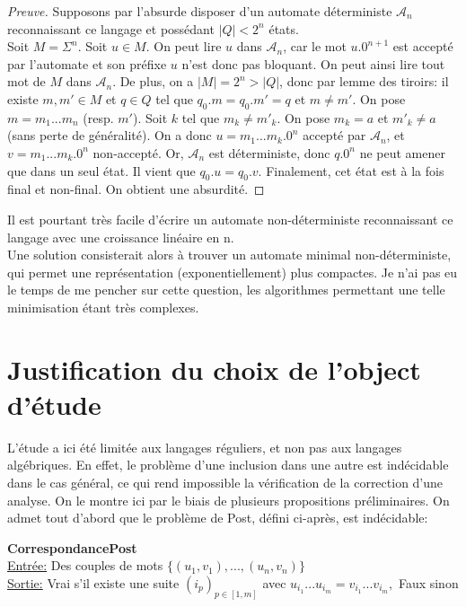 \documentclass{article}
\newenvironment{preuve}{\begin{proof}[Preuve]}{\end{proof}}
\begin{document}
\begin{preuve}
    Supposons par l'absurde disposer d'un automate déterministe $\mathcal{A}_n$
    reconnaissant ce langage et possédant $|Q| < 2^n$ états. \\
    Soit $M = \Sigma^n$. Soit $u \in M$. On peut lire $u$ dans $\mathcal{A}_n$, car le mot $u.0^{n+1}$
    est accepté par l'automate et son préfixe $u$ n'est donc pas bloquant. On peut ainsi lire tout mot de $M$ dans $\mathcal{A}_n$.
    De plus, on a $|M| = 2^n > |Q|$, donc par lemme des tiroirs: il existe $m, m' \in M$ et $q \in Q$ tel que $q_0.m = q_0.m' = q$
    et $m \neq m'$. On pose $m = m_1...m_n$ (resp. $m'$). Soit $k$ tel que $m_k \neq m'_k$. On pose $m_k = a$ et $m'_k \neq a$ (sans perte
    de généralité). On a donc $u = m_1...m_k.0^n$ accepté par $\mathcal{A}_n$, et $v = m_1...m_k.0^n$ non-accepté.
    Or, $\mathcal{A}_n$ est déterministe, donc $q.0^n$ ne peut amener que dans un seul état. Il vient que $q_0.u = q_0.v$.
    Finalement, cet état est à la fois final et non-final. On obtient une absurdité.
\end{preuve}

Il est pourtant très facile d'écrire un automate non-déterministe reconnaissant ce langage
avec une croissance linéaire en n.  \\ %
Une solution consisterait alors à trouver un automate minimal non-déterministe, qui permet une représentation
(exponentiellement) plus compactes. Je n'ai pas eu le temps de me pencher sur cette question,
les algorithmes permettant une telle minimisation étant très complexes.

\section{Justification du choix de l'object d'étude}

L'étude a ici été limitée aux langages réguliers, et non pas aux langages algébriques. En effet,
le problème d'une inclusion dans une autre est indécidable dans le cas général, ce qui rend impossible la vérification
de la correction d'une analyse. On le montre ici par le biais de plusieurs propositions préliminaires.
On admet tout d'abord que le problème de Post, défini ci-après, est indécidable:

\hfill\newline
\textbf{CorrespondancePost} \\
\underline{Entrée:} Des couples de mots $\{(u_1, v_1), ..., (u_n, v_n)\}$ \\
\underline{Sortie:} Vrai s'il existe une suite
    $(i_p)_{p \in [1, m]}$ avec $u_{i_1}...u_{i_m} = v_{i_1}...v_{i_m},$ Faux sinon \newline
\end{document}
